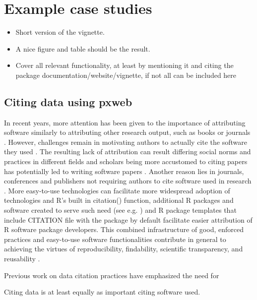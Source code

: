 \section[Usage]{Example case studies}

\begin{itemize}
    \item Short version of the vignette.  \item A nice figure and
    table should be the result.  \item Cover all relevant
    functionality, at least by mentioning it and citing the package
    documentation/website/vignette, if not all can be included here
\end{itemize}




\subsection{Citing data using pxweb}

In recent years, more attention has been given to the importance of attributing software similarly to attributing other research output, such as books or journals \citep{Smith2016software}. However, challenges remain in motivating authors to actually cite the software they used \citep{Katz2018}. The resulting lack of attribution can result differing social norms and practices in different fields and scholars being more accustomed to citing papers has potentially led to writing software papers \citep{Smith2016software}. Another reason lies in journals, conferences and publishers not requiring authors to cite software used in research \citep{Katz2018}. More easy-to-use technologies can facilitate more widespread adoption of technologies \citep{Davis1989} and R's built in citation() function, additional R packages and software created to serve such need (see e.g. \cite{Hernangomez2021, Druskat2021}) and R package templates that include CITATION file with the package by default facilitate easier attribution of R software package developers. This combined infrastructure of good, enforced practices and easy-to-use software functionalities contribute in general to achieving the virtues of reproducibility, findability, scientific transparency, and reusability \citep{Hausman2019}.

Previous work on data citation practices have emphasized the need for 

Citing data is at least equally as important citing software used. 

